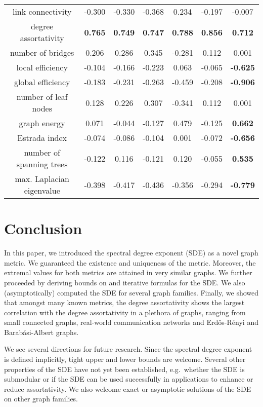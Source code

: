 \documentclass{comnet}%
\newcommand{\ER}{Erd\H{o}s-R\'{e}nyi}
\newcommand{\BA}{Barab{\'a}si-Albert}
\begin{document}
\begin{table}[H]
\begin{tabular}{c|c|c|c|c|c|c}
		link connectivity & -0.300 & -0.330 & -0.368 & 0.234 & -0.197 & -0.007 \\
		degree assortativity & \textbf{0.765} & \textbf{0.749} & \textbf{0.747} & \textbf{0.788} & \textbf{0.856} & \textbf{0.712} \\
		number of bridges & 0.206 & 0.286 & 0.345 & -0.281 & 0.112 & 0.001 \\
		local efficiency & -0.104 & -0.166 & -0.223 & 0.063 & -0.065 & \textbf{-0.625} \\
		global efficiency & -0.183 & -0.231 & -0.263 & -0.459 & -0.208 & \textbf{-0.906} \\
		number of leaf nodes & 0.128 & 0.226 & 0.307 & -0.341 & 0.112 & 0.001 \\
		graph energy & 0.071 & -0.044 & -0.127 & 0.479 & -0.125 & \textbf{0.662} \\
		Estrada index & -0.074 & -0.086 & -0.104 & 0.001 & -0.072 & \textbf{-0.656} \\
		number of spanning trees & -0.122 & 0.116 & -0.121 & 0.120 & -0.055 & \textbf{0.535} \\
		max. Laplacian eigenvalue & -0.398 & -0.417 & -0.436 & -0.356 & -0.294 & \textbf{-0.779} \\
		\hline\hline
	\end{tabular}
	\label{tab_correlation}
\end{table}


\section{Conclusion}
\label{sec_conclusion}
In this paper, we introduced the spectral degree exponent (SDE) as a novel graph metric. We guaranteed the existence and uniqueness of the metric. Moreover, the extremal values for both metrics are attained in very similar graphs. We further proceeded by deriving bounds on and iterative formulas for the SDE. We also (asymptotically) computed the SDE for several graph families. Finally, we showed that amongst many known metrics, the degree assortativity shows the largest correlation with the degree assortativity in a plethora of graphs, ranging from small connected graphs, real-world communication networks and \ER{} and \BA{} graphs.

We see several directions for future research. Since the spectral degree exponent is defined implicitly, tight upper and lower bounds are welcome. Several other properties of the SDE have not yet been established, e.g.\ whether the SDE is submodular or if the SDE can be used successfully in applications to enhance or reduce assortativity. We also welcome exact or asymptotic solutions of the SDE on other graph families.
\end{document}
